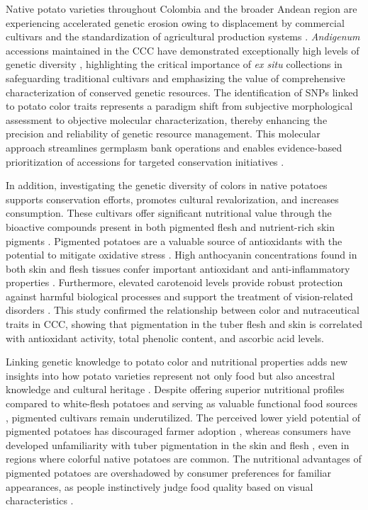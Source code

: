 \documentclass[pdflatex,sn-mathphys-ay]{sn-jnl}%
\begin{document}
Native potato varieties throughout Colombia and the broader Andean region are experiencing accelerated genetic erosion owing to displacement by commercial cultivars and the standardization of agricultural production systems \citep{arcespatial,ellis2018genetic}. \textit{Andigenum} accessions maintained in the CCC have demonstrated exceptionally high levels of genetic diversity \citep{Berdugo2017}, highlighting the critical importance of \textit{ex situ} collections in safeguarding traditional cultivars and emphasizing the value of comprehensive characterization of conserved genetic resources. The identification of SNPs linked to potato color traits represents a paradigm shift from subjective morphological assessment to objective molecular characterization, thereby enhancing the precision and reliability of genetic resource management. This molecular approach streamlines germplasm bank operations and enables evidence-based prioritization of accessions for targeted conservation initiatives \citep{ellis2018genetic}.



In addition, investigating the genetic diversity of colors in native potatoes supports conservation efforts, promotes cultural revalorization, and increases consumption. These cultivars offer significant nutritional value through the bioactive compounds present in both pigmented flesh and nutrient-rich skin pigments \citep{bvenura2022pigmented}.  Pigmented potatoes are a valuable source of antioxidants with the potential to mitigate oxidative stress \citep{andre2007andean}. High anthocyanin concentrations found in both skin and flesh tissues confer important antioxidant and anti-inflammatory properties \citep{brown2008variability}. Furthermore, elevated carotenoid levels provide robust protection against harmful biological processes and support the treatment of vision-related disorders \citep{bvenura2022pigmented,burgos2020potato,vollmer2022world}. This study confirmed the relationship between color and nutraceutical traits in CCC, showing that pigmentation in the tuber flesh and skin is correlated with antioxidant activity, total phenolic content, and ascorbic acid levels.


Linking genetic knowledge to potato color and nutritional properties adds new insights into how potato varieties represent not only food but also ancestral knowledge and cultural heritage \citep{galvis2022cultural}. Despite offering superior nutritional profiles compared to white-flesh potatoes and serving as valuable functional food sources \citep{kumar2024anthocyanin}, pigmented cultivars remain underutilized. The perceived lower yield potential of pigmented potatoes has discouraged farmer adoption \citep{witbooi2021role}, whereas consumers have developed unfamiliarity with tuber pigmentation in the skin and flesh \citep{paakki2016consumer}, even in regions where colorful native potatoes are common. The nutritional advantages of pigmented potatoes are overshadowed by consumer preferences for familiar appearances, as people instinctively judge food quality based on visual characteristics \citep{derndorfer2017colours}.
\end{document}
